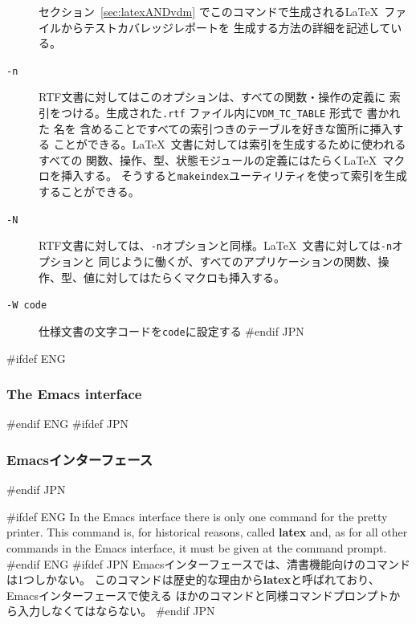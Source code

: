 \documentclass[\pformat,12pt]{article}
\begin{document}
\begin{description}
  セクション~\ref{sec:latexANDvdm} でこのコマンドで生成される\LaTeX\ ファイルからテストカバレッジレポートを
  生成する方法の詳細を記述している。

\item[{\tt -n}]
  RTF文書に対してはこのオプションは、すべての関数・操作の定義に
  索引をつける。生成された{\tt .rtf} ファイル内に\texttt{VDM\_TC\_TABLE} 形式で
  書かれた
   名を
  含めることですべての索引つきのテーブルを好きな箇所に挿入する
  ことができる。\LaTeX\ 文書に対しては索引を生成するために使われるすべての
  関数、操作、型、状態モジュールの定義にはたらく\LaTeX\ マクロを挿入する。
  そうすると{\tt makeindex}ユーティリティを使って索引を生成することができる。

\item[{\tt -N}]
  RTF文書に対しては、{\tt -n}オプションと同様。\LaTeX\ 文書に対しては{\tt -n}オプションと
  同じように働くが、すべてのアプリケーションの関数、操作、型、値に対してはたらくマクロも挿入する。

\item[{\tt -W code}] 仕様文書の文字コードを{\tt code}に設定する
#endif JPN

\end{description}

#ifdef ENG
\subsubsection{The Emacs interface}
#endif ENG
#ifdef JPN
\subsubsection{Emacsインターフェース}
#endif JPN

#ifdef ENG
In the Emacs interface there is only one command for the pretty
printer. This command is, for historical reasons, called \textbf{latex}
and, as for all other commands in the Emacs interface, it must be given at
the command prompt.
#endif ENG
#ifdef JPN
Emacsインターフェースでは、清書機能向けのコマンドは1つしかない。
このコマンドは歴史的な理由から\textbf{latex}と呼ばれており、Emacsインターフェースで使える
ほかのコマンドと同様コマンドプロンプトから入力しなくてはならない。
#endif JPN
\end{document}
